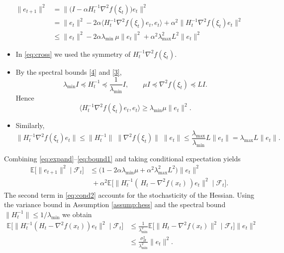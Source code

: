 \documentclass{article}
\newcommand{\E}{\mathbb{E}}
\begin{document}
\begin{align}
\|e_{t+1}\|^{2}
   &=\big\|\big(I-\alpha H_{t}^{-1}\nabla^{2}f(\xi_{t})\big)e_{t}\big\|^{2}
      \tag{11}\label{eq:expand}\\
   &=\|e_{t}\|^{2}
      -2\alpha\langle H_{t}^{-1}\nabla^{2}f(\xi_{t})e_{t},e_{t}\rangle
      +\alpha^{2}\|H_{t}^{-1}\nabla^{2}f(\xi_{t})e_{t}\|^{2}
      \tag{12}\label{eq:cross}\\
   &\le\|e_{t}\|^{2}
      -2\alpha\lambda_{\min}\,\mu\|e_{t}\|^{2}
      +\alpha^{2}\lambda_{\max}^{2}L^{2}\|e_{t}\|^{2}
      \tag{13}\label{eq:bound1}
\end{align}
\begin{itemize}
\item[Step 1:]  In \eqref{eq:cross} we used the symmetry of $H_{t}^{-1}\nabla^{2}f(\xi_{t})$.
\item[Step 2:]  By the spectral bounds \eqref{4} and \eqref{3},
\[
\lambda_{\min} I\preceq H_{t}^{-1}\preceq \frac{1}{\lambda_{\min}}I,\qquad
\mu I\preceq \nabla^{2}f(\xi_{t})\preceq L I.
\]
Hence
\[
\langle H_{t}^{-1}\nabla^{2}f(\xi_{t})e_{t},e_{t}\rangle
   \ge \lambda_{\min}\mu\|e_{t}\|^{2}.
\tag{14}
\]
\item[Step 3:]  Similarly,
\[
\|H_{t}^{-1}\nabla^{2}f(\xi_{t})e_{t}\|
   \le \|H_{t}^{-1}\|\;\|\nabla^{2}f(\xi_{t})\|\;\|e_{t}\|
   \le \frac{\lambda_{\max}}{\lambda_{\min}}L\|e_{t}\|
   =\lambda_{\max}L\|e_{t}\|.
\tag{15}
\]
\end{itemize}
Combining \eqref{eq:expand}–\eqref{eq:bound1} and taking conditional expectation yields
\begin{align}
\E\!\big[\|e_{t+1}\|^{2}\mid\mathcal{F}_{t}\big]
   &\le\Big(1-2\alpha\lambda_{\min}\mu+\alpha^{2}\lambda_{\max}^{2}L^{2}\Big)\|e_{t}\|^{2}
      \tag{16}\label{eq:cond1}\\
   &\;+\alpha^{2}\E\!\big[\|H_{t}^{-1}(\,H_{t}-\nabla^{2}f(x_{t})\,)e_{t}\|^{2}\mid\mathcal{F}_{t}\big].
      \tag{17}\label{eq:cond2}
\end{align}
The second term in \eqref{eq:cond2} accounts for the stochasticity of the Hessian.  Using the variance bound in Assumption \ref{assump:hess} and the spectral bound $\|H_{t}^{-1}\|\le 1/\lambda_{\min}$ we obtain
\begin{align}
\E\!\big[\|H_{t}^{-1}(H_{t}-\nabla^{2}f(x_{t}))e_{t}\|^{2}\mid\mathcal{F}_{t}\big]
   &\le \frac{1}{\lambda_{\min}^{2}}\E\!\big[\|H_{t}-\nabla^{2}f(x_{t})\|^{2}\mid\mathcal{F}_{t}\big]\|e_{t}\|^{2}
   \tag{18}\label{eq:varbound}\\
   &\le \frac{\sigma_{H}^{2}}{\lambda_{\min}^{2}}\|e_{t}\|^{2}.
   \tag{19}
\end{align}
\end{document}
